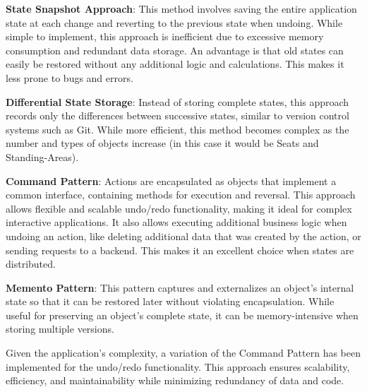 \begin{compactenum}
\item \textbf{State Snapshot Approach}: This method involves saving the entire application state at each change and reverting to the previous state when undoing. While simple to implement, this approach is inefficient due to excessive memory consumption and redundant data storage. An advantage is that old states can easily be restored without any additional logic and calculations. This makes it less prone to bugs and errors.
\item \textbf{Differential State Storage}: Instead of storing complete states, this approach records only the differences between successive states, similar to version control systems such as Git. While more efficient, this method becomes complex as the number and types of objects increase (in this case it would be Seats and Standing-Areas).
\item \textbf{Command Pattern}: Actions are encapsulated as objects that implement a common interface, containing methods for execution and reversal. This approach allows flexible and scalable undo/redo functionality, making it ideal for complex interactive applications. It also allows executing additional business logic when undoing an action, like deleting additional data that was created by the action, or sending requests to a backend. This makes it an excellent choice when states are distributed.
\item \textbf{Memento Pattern}: This pattern captures and externalizes an object's internal state so that it can be restored later without violating encapsulation. While useful for preserving an object's complete state, it can be memory-intensive when storing multiple versions.
\end{compactenum}

Given the application's complexity, a variation of the Command Pattern has been implemented for the undo/redo functionality. This approach ensures scalability, efficiency, and maintainability while minimizing redundancy of data and code.


